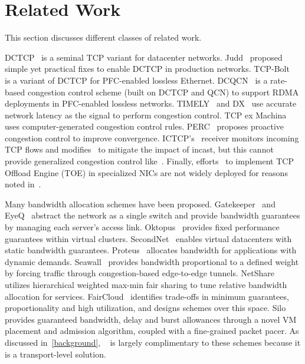 \section{Related Work}
\label{related}
This section discusses different classes of related work.

DCTCP~\cite{alizadeh2011data} is a seminal TCP variant for datacenter networks.
Judd~\cite{judd2015nsdi} proposed simple yet practical fixes to enable DCTCP in production networks.
TCP-Bolt~\cite{stephens2014practical} is a variant of DCTCP for PFC-enabled lossless Ethernet.
DCQCN~\cite{zhu2015congestion} is a rate-based congestion control scheme (built on DCTCP and QCN) to
support RDMA deployments in PFC-enabled lossless networks.
TIMELY~\cite{mittal2015timely} and DX~\cite{lee2015accurate} 
use accurate network latency as the signal to perform congestion control.
TCP ex Machina~\cite{winstein2013tcp} uses computer-generated congestion control rules.
PERC~\cite{jose2015high} proposes proactive congestion control to improve convergence.
ICTCP's~\cite{wu2010ictcp} receiver monitors incoming TCP flows and 
modifies~\rwnd{} to mitigate the impact of incast, but this cannot
provide generalized congestion control like~\acdc{}.
Finally, efforts~\cite{dell-toe,chelsio-toe} to 
implement TCP Offload Engine (TOE) in specialized NICs are not widely deployed for reasons noted in~\cite{mogul2003tcp,linux-toe}.

 Many bandwidth allocation schemes have been proposed.
Gatekeeper~\cite{rodrigues2011gatekeeper} and EyeQ~\cite{jeyakumar2013eyeq} abstract the network as a single
switch and provide bandwidth guarantees by managing each server's access link.
Oktopus~\cite{Ballani2011oktopus} provides fixed performance guarantees within virtual clusters.
SecondNet~\cite{Guo2010Secondnet} enables virtual datacenters with static bandwidth guarantees.
Proteus~\cite{Xie2012Proteus} allocates bandwidth for applications with dynamic demands.
Seawall~\cite{shieh2011sharing} provides bandwidth proportional to a defined weight by
forcing traffic through congestion-based edge-to-edge tunnels. 
NetShare~\cite{Lam2012NetShare} utilizes hierarchical weighted max-min fair sharing to tune relative bandwidth allocation for services.
FairCloud~\cite{Popa2012Faircloud} identifies trade-offs in minimum
guarantees, proportionality and high utilization, and designs schemes over this space.
Silo~\cite{jang2015silo} provides guaranteed bandwidth, delay and burst allowances through a novel VM placement and admission 
algorithm, coupled with a fine-grained packet pacer. As discussed in~\cref{background}, 
~\acdc{} is largely complimentary to these schemes because it is a transport-level solution.

